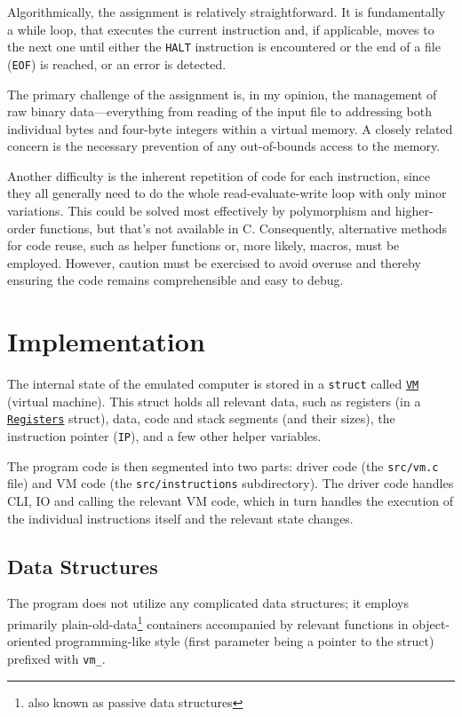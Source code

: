 \documentclass[10pt,a4paper,final]{article}
\newcommand{\code}[1]{\texttt{#1}}
\begin{document}
Algorithmically, the assignment is relatively straightforward. It is
fundamentally a while loop, that executes the current instruction and, if
applicable, moves to the next one until either the \code{HALT} instruction is
encountered or the end of a file (\code{EOF}) is reached, or an error is
detected.

The primary challenge of the assignment is, in my opinion, the management of raw
binary data---everything from reading of the input file to addressing both
individual bytes and four-byte integers within a virtual memory. A closely
related concern is the necessary prevention of any out-of-bounds access to the
memory.

Another difficulty is the inherent repetition of code for each instruction,
since they all generally need to do the whole read-evaluate-write loop with only
minor variations. This could be solved most effectively by polymorphism and
higher-order functions, but that's not available in C. Consequently, alternative
methods for code reuse, such as helper functions or, more likely, macros, must
be employed. However, caution must be exercised to avoid overuse and thereby
ensuring the code remains comprehensible and easy to debug.

\section{Implementation}
\label{sec:impl}

The internal state of the emulated computer is stored in a \code{struct} called
\hyperlink{vm}{\code{VM}} (virtual machine). This struct holds all relevant
data, such as registers (in a \hyperlink{registers}{\code{Registers}} struct),
data, code and stack segments (and their sizes), the instruction pointer
(\code{IP}), and a few other helper variables.

The program code is then segmented into two parts: driver code (the
\code{src/vm.c} file) and VM code (the \code{src/instructions} subdirectory).
The driver code handles CLI, IO and calling the relevant VM code, which in turn
handles the execution of the individual instructions itself and the relevant
state changes. 

\subsection{Data Structures}

The program does not utilize any complicated data structures; it employs
primarily plain-old-data\footnote{also known as passive data structures}
containers accompanied by relevant functions in object-oriented programming-like
style (first parameter being a pointer to the struct) prefixed with \code{vm_}.
\end{document}
